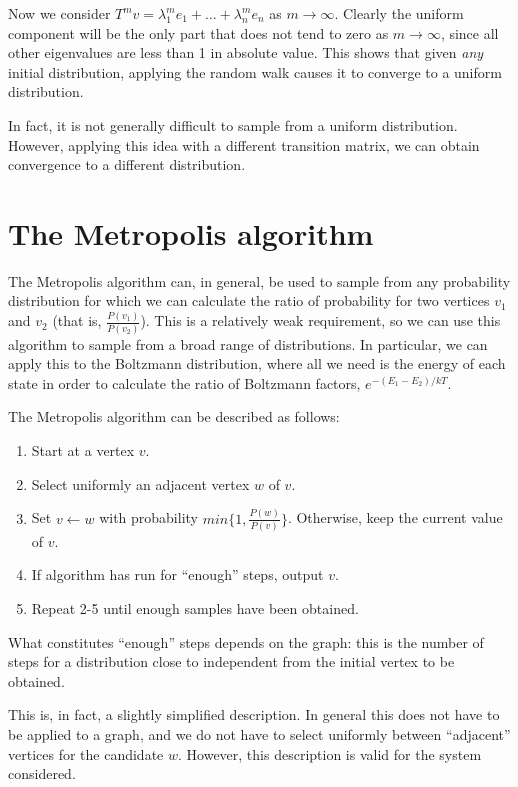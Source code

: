 \documentclass{article}
\begin{document}
Now we consider $T^mv = \lambda_1^me_1 + ... + \lambda_n^me_n$ as $m\rightarrow\infty$.
Clearly the uniform component will be the only part that does not tend to zero as $m\rightarrow\infty$, since all other eigenvalues are less than 1 in absolute value.
This shows that given \emph{any} initial distribution, applying the random walk causes it to converge to a uniform distribution.

In fact, it is not generally difficult to sample from a uniform distribution.
However, applying this idea with a different transition matrix, we can obtain convergence to a different distribution.

\section{The Metropolis algorithm}
The Metropolis algorithm can, in general, be used to sample from any probability distribution for which we can calculate the ratio of probability for two vertices $v_1$ and $v_2$ (that is, $\frac{P(v_1)}{P(v_2)}$).
This is a relatively weak requirement, so we can use this algorithm to sample from a broad range of distributions.
In particular, we can apply this to the Boltzmann distribution, where all we need is the energy of each state in order to calculate the ratio of Boltzmann factors, $e^{-(E_1-E_2)/kT}$.

The Metropolis algorithm can be described as follows:
\begin{enumerate}
    \item Start at a vertex $v$.
    \item Select uniformly an adjacent vertex $w$ of $v$.
    \item Set $v \leftarrow w$ with probability $min\{1, \frac{P(w)}{P(v)}\}$. Otherwise, keep the current value of $v$.
    \item If algorithm has run for ``enough'' steps, output $v$.
    \item Repeat 2-5 until enough samples have been obtained.
\end{enumerate}

What constitutes ``enough'' steps depends on the graph: this is the number of steps for a distribution close to independent from the initial vertex to be obtained.

This is, in fact, a slightly simplified description.
In general this does not have to be applied to a graph, and we do not have to select uniformly between ``adjacent'' vertices for the candidate $w$.
However, this description is valid for the system considered.
\end{document}

